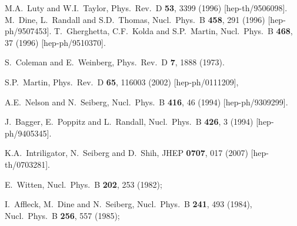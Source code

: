 \documentclass[12pt]{article}
\begin{document}
\begin{thebibliography}{999}
M.A.~Luty and W.I.~Taylor,
  Phys.\ Rev.\ D {\bf 53}, 3399 (1996)
  [hep-th/9506098].
M.~Dine, L.~Randall and S.D.~Thomas,
  Nucl.\ Phys.\ B {\bf 458}, 291 (1996)
  [hep-ph/9507453].
T.~Gherghetta, C.F.~Kolda and S.P.~Martin,
  Nucl.\ Phys.\ B {\bf 468}, 37 (1996)
  [hep-ph/9510370].

S.~Coleman and E.~Weinberg,
  Phys.\ Rev.\ D {\bf 7}, 1888 (1973).

S.P.~Martin,
  Phys.\ Rev.\ D {\bf 65}, 116003 (2002)
  [hep-ph/0111209],

  A.E.~Nelson and N.~Seiberg,
  Nucl.\ Phys.\  B {\bf 416}, 46 (1994)
  [hep-ph/9309299].
  
J.~Bagger, E.~Poppitz and L.~Randall,
  Nucl.\ Phys.\  B {\bf 426}, 3 (1994)
  [hep-ph/9405345].

  K.A.~Intriligator, N.~Seiberg and D.~Shih,
  JHEP {\bf 0707}, 017 (2007)
  [hep-th/0703281].

E.~Witten, 
  Nucl.\ Phys.\ B {\bf 202}, 253 (1982);

I.~Affleck, M.~Dine and N.~Seiberg, 
  Nucl.\ Phys.\ B {\bf 241}, 493 (1984),
  Nucl.\ Phys.\ B {\bf 256}, 557 (1985);



\end{thebibliography}
\end{document}
